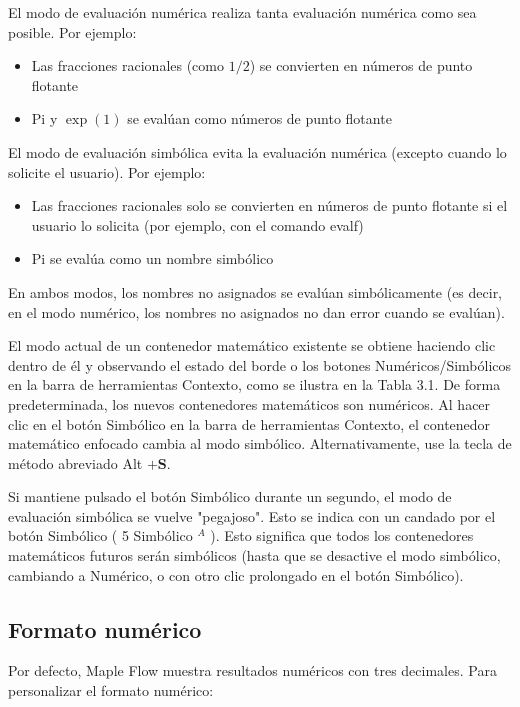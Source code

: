 
El modo de evaluación numérica realiza tanta evaluación numérica como sea posible. Por ejemplo:

\begin{itemize}
  \item Las fracciones racionales (como $1 / 2$) se convierten en números de punto flotante

\item Pi y $\exp (1)$ se evalúan como números de punto flotante
\end{itemize}

El modo de evaluación simbólica evita la evaluación numérica (excepto cuando lo solicite el usuario). Por ejemplo:

\begin{itemize}
  \item Las fracciones racionales solo se convierten en números de punto flotante si el usuario lo solicita (por ejemplo, con el comando evalf)
  
  \item Pi se evalúa como un nombre simbólico
\end{itemize}

En ambos modos, los nombres no asignados se evalúan simbólicamente (es decir, en el modo numérico, los nombres no asignados no dan error cuando se evalúan).

El modo actual de un contenedor matemático existente se obtiene haciendo clic dentro de él y observando el estado del borde o los botones Numéricos/Simbólicos en la barra de herramientas Contexto, como se ilustra en la Tabla 3.1. De forma predeterminada, los nuevos contenedores matemáticos son numéricos. Al hacer clic en el botón Simbólico en la barra de herramientas Contexto, el contenedor matemático enfocado cambia al modo simbólico. Alternativamente, use la tecla de método abreviado Alt $+\mathbf{S}$.

Si mantiene pulsado el botón Simbólico durante un segundo, el modo de evaluación simbólica se vuelve "pegajoso". Esto se indica con un candado por el botón Simbólico ( 5 Simbólico ${ }^{A}$ ). Esto significa que todos los contenedores matemáticos futuros serán simbólicos (hasta que se desactive el modo simbólico, cambiando a Numérico, o con otro clic prolongado en el botón Simbólico).

\subsection{Formato numérico}
Por defecto, Maple Flow muestra resultados numéricos con tres decimales. Para personalizar el formato numérico:

